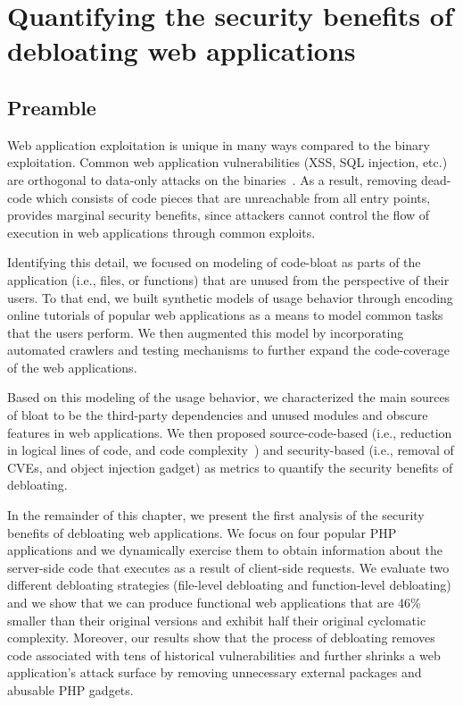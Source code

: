 \chapter{Quantifying the security benefits of debloating web applications}
\label{chap:lim}

\section*{Preamble}
Web application exploitation is unique in many ways compared to the binary exploitation. 
Common web application vulnerabilities (XSS, SQL injection, etc.) are orthogonal to data-only attacks on the binaries~\cite{ispoglou2018block}. 
As a result, removing dead-code which consists of code pieces that are unreachable from all entry points, provides marginal security benefits, since attackers cannot control the flow of execution in web applications through common exploits. 

Identifying this detail, we focused on modeling of code-bloat as parts of the application (i.e., files, or functions) that are unused from the perspective of their users. 
To that end, we built synthetic models of usage behavior through encoding online tutorials of popular web applications as a means to model common tasks that the users perform. 
We then augmented this model by incorporating automated crawlers and testing mechanisms to further expand the code-coverage of the web applications. 

Based on this modeling of the usage behavior, we characterized the main sources of bloat to be the third-party dependencies and unused modules and obscure features in web applications. 
We then proposed source-code-based (i.e., reduction in logical lines of code, and code complexity~\cite{gill1991cyclomatic}) and security-based (i.e., removal of CVEs, and object injection gadget) as metrics to quantify the security benefits of debloating. 

In the remainder of this chapter, we present the first analysis of the security benefits of debloating web applications. 
We focus on four popular PHP applications and
we dynamically exercise them to obtain information about the server-side code
that executes as a result of client-side requests. We evaluate two different
debloating strategies (file-level debloating and function-level debloating)
and we show that we can produce functional web applications that are 46\%
smaller than their original versions and exhibit half their original cyclomatic
complexity. Moreover, our results show that the process of debloating removes
code associated with tens of historical vulnerabilities and further shrinks
a web application's attack surface by removing unnecessary external packages
and abusable PHP gadgets.

